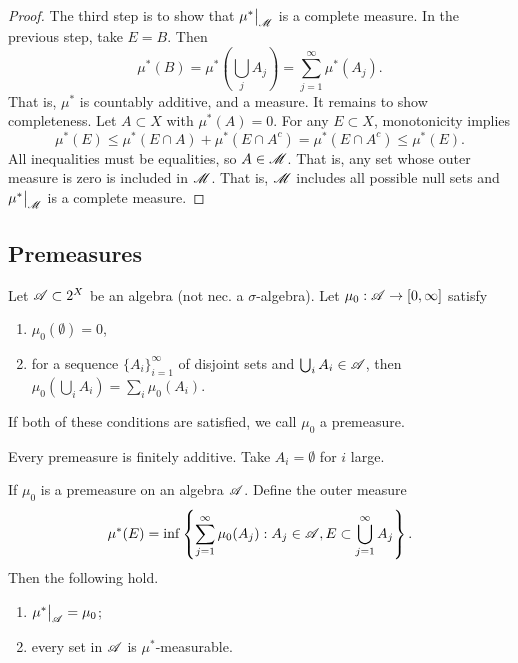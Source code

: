 \documentclass[12pt]{article} %
\begin{document}
\begin{proof}
    The third step is to show that $\restr{\mu^*}{\SM}$ is a complete measure. In the previous step, take $E = B$. Then \[\mu^*(B) = \mu^*\left(\bigcup_j A_j \right)= \sum_{j=1}^{\infty} \mu^*(A_j).\] That is, $\mu^*$ is countably additive, and a measure. It remains to show completeness. Let $A \subset X$ with $\mu^*(A) = 0$. For any $E \subset X$, monotonicity implies \[\mu^*(E) \leq \mu^*(E \cap A) + \mu^*(E \cap A^c) = \mu^*(E \cap A^c) \leq \mu^*(E).\] All inequalities must be equalities, so $A \in \mathscr{M}$. That is, any set whose outer measure is zero is included in $\mathscr{M}$. That is, $\mathscr{M}$ includes all possible null sets and $\restr{\mu^*}{\SM}$ is a complete measure.
\end{proof}

\subsection{Premeasures}

\begin{definition}
    Let $\mathscr{A} \subset 2^X$ be an algebra (not nec. a $\sigma$-algebra). Let $\mu_0 : \mathscr{A} \to [0,\infty]$ satisfy \begin{enumerate}
        \item $\mu_0(\emptyset) = 0$,
        \item for a sequence $\{A_i\}_{i=1}^{\infty}$ of disjoint sets and $\bigcup_i A_i \in \mathscr{A}$, then $\mu_0\left(\bigcup_i A_i \right) = \sum_i \mu_0(A_i)$.
    \end{enumerate}
    If both of these conditions are satisfied, we call $\mu_0$ a premeasure.
\end{definition}

\begin{remark}
    Every premeasure is finitely additive. Take $A_i = \emptyset$ for $i$ large.
\end{remark}

\begin{proposition}
    If $\mu_0$ is a premeasure on an algebra $\mathscr{A}$. Define the outer measure \[\mu^*(E) = \inf \left\{\sum_{j=1}^{\infty} \mu_0(A_j) : A_j \in \mathscr{A}, E \subset \bigcup_{j=1}^{\infty} A_j \right\}.\] Then the following hold. \begin{enumerate}
        \item $\restr{\mu^*}{\SA} = \mu_0$;
        \item every set in $\mathscr{A}$ is $\mu^*$-measurable.
    \end{enumerate}
\end{proposition}
\end{document}
